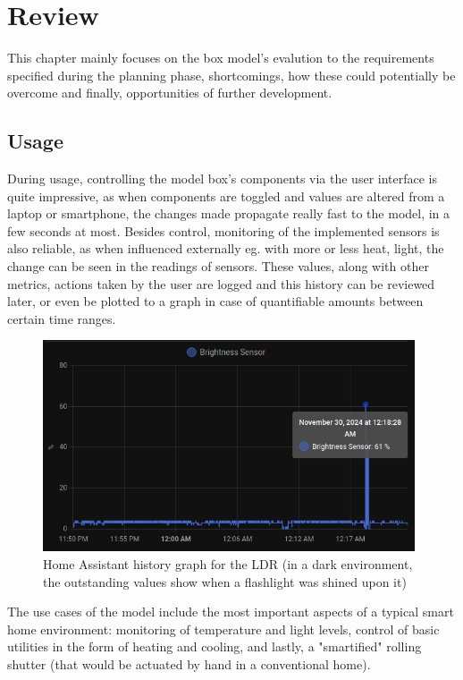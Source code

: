 \chapter{Review}

This chapter mainly focuses on the box model's evalution to the requirements specified during the planning phase, shortcomings, how these could potentially be overcome and finally, opportunities of further development.

\section{Usage}

During usage, controlling the model box's components via the user interface is quite impressive, as when components are toggled and values are altered from a laptop or smartphone, the changes made propagate really fast to the model, in a few seconds at most. Besides control, monitoring of the implemented sensors is also reliable, as when influenced externally eg. with more or less heat, light, the change can be seen in the readings of sensors. These values, along with other metrics, actions taken by the user are logged and this history can be reviewed later, or even be plotted to a graph in case of quantifiable amounts between certain time ranges.

\begin{figure}[!ht]
    \centering
    \includegraphics[width=110mm, keepaspectratio]{figures/homeassistant_graph_history.png}
    \caption{Home Assistant history graph for the LDR (in a dark environment, the outstanding values show when a flashlight was shined upon it)}
    \label{fig:HAgraphHistory}
  \end{figure}

The use cases of the model include the most important aspects of a typical smart home environment: monitoring of temperature and light levels, control of basic utilities in the form of heating and cooling, and lastly, a "smartified" rolling shutter (that would be actuated by hand in a conventional home).


